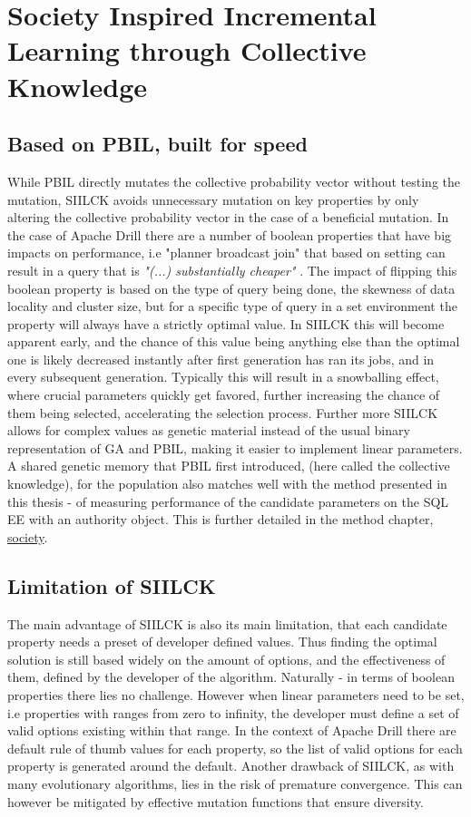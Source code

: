 \documentclass[a4paper,english]{report}
\begin{document}
	\section{Society Inspired Incremental Learning through Collective Knowledge}
		\subsection{Based on PBIL, built for speed}
		While PBIL directly mutates the collective probability vector without testing the mutation, SIILCK avoids unnecessary mutation on key properties by only altering the collective probability vector in the case of a beneficial mutation. In the case of Apache Drill there are a number of boolean properties that have big impacts on performance, i.e "planner broadcast join" that based on setting can result in a query that is \textit{"(...) substantially cheaper"} \cite{joinplanning}. The impact of flipping this boolean property is based on the type of query being done, the skewness of data locality and cluster size, but for a specific type of query in a set environment the property will always have a strictly optimal value. In SIILCK this will become apparent early, and the chance of this value being anything else than the optimal one is likely decreased instantly after first generation has ran its jobs, and in every subsequent generation. Typically this will result in a snowballing effect, where crucial parameters quickly get favored, further increasing the chance of them being selected, accelerating the selection process. Further more SIILCK allows for complex values as genetic material instead of the usual binary representation of GA and PBIL, making it easier to implement linear parameters. A shared genetic memory that PBIL first introduced, (here called the collective knowledge), for the population also matches well with the method presented in this thesis - of measuring performance of the candidate parameters on the SQL EE with an authority object. This is further detailed in the method chapter, \hyperref[sec:society]{society}.
		\subsection{Limitation of SIILCK}
		The main advantage of SIILCK is also its main limitation, that each candidate property needs a preset of developer defined values. Thus finding the optimal solution is still based widely on the amount of options, and the effectiveness of them, defined by the developer of the algorithm. Naturally - in terms of boolean properties there lies no challenge. However when linear parameters need to be set, i.e properties with ranges from zero to infinity, the developer must define a set of valid options existing within that range. In the context of Apache Drill there are default rule of thumb values for each property, so the list of valid options for each property is generated around the default. Another drawback of SIILCK, as with many evolutionary algorithms, lies in the risk of premature convergence. This can however be mitigated by effective mutation functions that ensure diversity.
	\pagebreak
\end{document}
